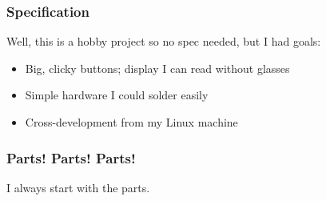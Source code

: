 \documentclass{beamer}
\newcommand{\tgreen}[1]{\textcolor{my-green}{#1}}
\begin{document}
\begin{frame}
  \frametitle{Specification}

  Well, this is a hobby project so no spec needed, but I had goals:
    \begin{itemize}
    \item Big, clicky buttons; display I can read without glasses
    \item Simple hardware I could solder easily
    \item Cross-development from my Linux machine
    \end{itemize}

\end{frame}

\begin{frame}[shrink=5]
  \frametitle{Parts! Parts! Parts!}

  \vskip -0.15in
  \tgreen{I always start with the parts.}


\end{frame}
\end{document}
